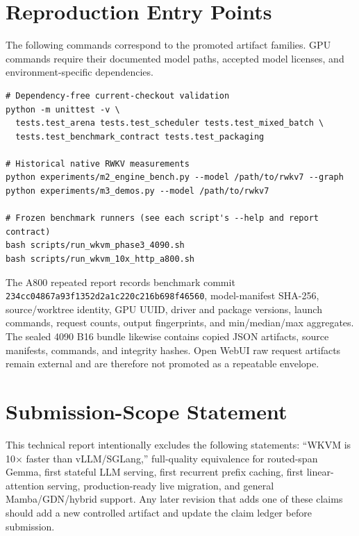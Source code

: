 \documentclass[10pt,letterpaper]{article}
\newcommand{\code}[1]{\texttt{#1}}
\newcommand{\wkvm}{\textsc{WKVM}}
\begin{document}
\appendix

\section{Reproduction Entry Points}

The following commands correspond to the promoted artifact families.  GPU
commands require their documented model paths, accepted model licenses, and
environment-specific dependencies.

\begin{verbatim}
# Dependency-free current-checkout validation
python -m unittest -v \
  tests.test_arena tests.test_scheduler tests.test_mixed_batch \
  tests.test_benchmark_contract tests.test_packaging

# Historical native RWKV measurements
python experiments/m2_engine_bench.py --model /path/to/rwkv7 --graph
python experiments/m3_demos.py --model /path/to/rwkv7

# Frozen benchmark runners (see each script's --help and report contract)
bash scripts/run_wkvm_phase3_4090.sh
bash scripts/run_wkvm_10x_http_a800.sh
\end{verbatim}

The A800 repeated report records benchmark commit
\code{234cc04867a93f1352d2a1c220c216b698f46560}, model-manifest SHA-256,
source/worktree identity, GPU UUID, driver and package versions, launch
commands, request counts, output fingerprints, and min/median/max aggregates.
The sealed 4090 B16 bundle likewise contains copied JSON artifacts, source
manifests, commands, and integrity hashes.  Open WebUI raw request artifacts
remain external and are therefore not promoted as a repeatable envelope.

\section{Submission-Scope Statement}

This technical report intentionally excludes the following statements:
``\wkvm{} is 10$\times$ faster than vLLM/SGLang,'' full-quality equivalence for
routed-span Gemma, first stateful LLM serving, first recurrent prefix caching,
first linear-attention serving, production-ready live migration, and general
Mamba/GDN/hybrid support.  Any later revision that adds one of these claims
should add a new controlled artifact and update the claim ledger before
submission.

\sloppy


\end{document}
